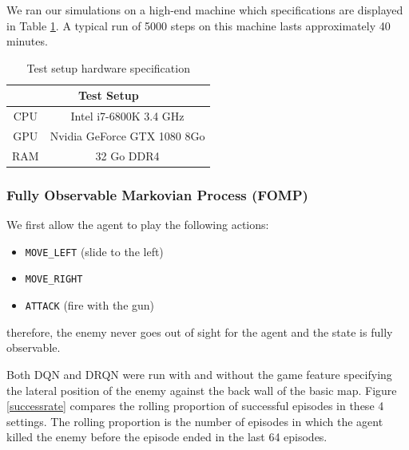 \documentclass[letterpaper]{article}
\newcommand\Tstrut{\rule{0pt}{2.6ex}}
\begin{document}
We ran our simulations on a  high-end machine which specifications are displayed in Table \ref{tab:specs}.
A typical run of 5000 steps on this machine lasts approximately 40 minutes.

\begin{table}[h]
\centering
\begin{tabular}{cc}
\multicolumn{2}{c}{Test Setup}                         \Tstrut\\ \hline
\multicolumn{1}{c|}{CPU} & Intel i7-6800K 3.4 GHz      \Tstrut\\
\multicolumn{1}{c|}{GPU} & Nvidia GeForce GTX 1080 8Go \Tstrut\\
\multicolumn{1}{c|}{RAM} & 32 Go DDR4                      \Tstrut
\end{tabular}
\caption{Test setup hardware specification}
\label{tab:specs}
\end{table}


\subsubsection{Fully Observable Markovian Process (FOMP)}
We first allow the agent to play the following actions:
\begin{itemize}
  \item \texttt{MOVE\_LEFT} (slide to the left)
  \item \texttt{MOVE\_RIGHT}
  \item \texttt{ATTACK} (fire with the gun)
\end{itemize}
therefore, the enemy never goes out of sight for the agent and the state is
fully observable.


Both DQN and DRQN were run with and without the game feature specifying the
lateral position of the enemy against the back wall of the basic map. Figure
\ref{successrate} compares the rolling proportion of successful episodes
in these 4 settings. The rolling proportion is the number of episodes in which
the agent killed the enemy before the episode ended in the last 64 episodes.
\end{document}

